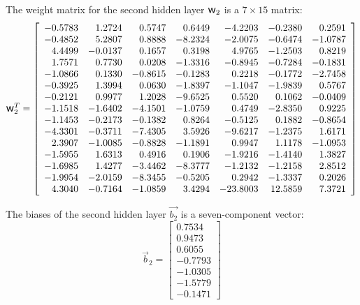 \documentclass[metals,article,accept,pdftex,moreauthors]{Definitions/mdpi}
\DeclareRobustCommand{\w}{\mbox{\large\ensuremath{\mathsf{w}}}}
\begin{document}
{The} weight matrix for the second hidden layer $\w_2$ is a $7\times15$ matrix:
\begin{equation*}
\w_2^T = \left[
\begin{array}{rrrrrrr}
-0.5783 & 1.2724 & 0.5747 & 0.6449 & -4.2203 & -0.2380 & 0.2591 \\
-0.4852 & 5.2807 & 0.8888 & -8.2324 & -2.0075 & -0.6474 & -1.0787 \\
4.4499 & -0.0137 & 0.1657 & 0.3198 & 4.9765 & -1.2503 & 0.8219 \\
1.7571 & 0.7730 & 0.0208 & -1.3316 & -0.8945 & -0.7284 & -0.1831 \\
-1.0866 & 0.1330 & -0.8615 & -0.1283 & 0.2218 & -0.1772 & -2.7458 \\
-0.3925 & 1.3994 & 0.0630 & -1.8397 & -1.1047 & -1.9839 & 0.5767 \\
-0.2121 & 0.9977 & 1.2028 & -9.6525 & 0.5520 & 0.1062 & -0.0409 \\
-1.1518 & -1.6402 & -4.1501 & -1.0759 & 0.4749 & -2.8350 & 0.9225 \\
-1.1453 & -0.2173 & -0.1382 & 0.8264 & -0.5125 & 0.1882 & -0.8654 \\
-4.3301 & -0.3711 & -7.4305 & 3.5926 & -9.6217 & -1.2375 & 1.6171 \\
2.3907 & -1.0085 & -0.8828 & -1.1891 & 0.9947 & 1.1178 & -1.0953 \\
-1.5955 & 1.6313 & 0.4916 & 0.1906 & -1.9216 & -1.4140 & 1.3827 \\
-1.6985 & 1.4277 & -3.4462 & -8.3777 & -1.2132 & -1.2158 & 2.8512 \\
-1.9954 & -2.0159 & -8.3455 & -0.5205 & 0.2942 & -1.3337 & 0.2026 \\
4.3040 & -0.7164 & -1.0859 & 3.4294 & -23.8003 & 12.5859 & 7.3721
\end{array}\right]
\end{equation*}

{The} biases of the second hidden layer $\overrightarrow{b_2}$ is a seven-component vector:
\begin{equation*}
\overrightarrow{b}_2 = \left[
\begin{array}{r}
0.7534 \\
0.9473 \\
0.6055 \\
-0.7793 \\
-1.0305 \\
-1.5779 \\
-0.1471
\end{array}\right]
\end{equation*}
\end{document}
